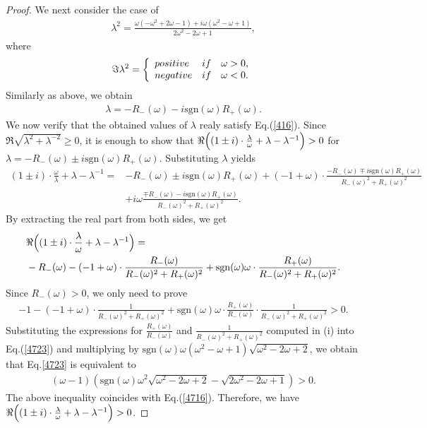 \documentclass[10pt,a4paper]{amsart}
\begin{document}
\begin{proof}
We next consider the case of 
\begin{align*}
\lambda ^2= \frac{\omega (-\omega ^2 +2\omega -1) + i\omega (\omega ^2 -\omega +1)}{2\omega ^2 -2\omega +1}, 
 \end{align*}
where 
\begin{eqnarray*}
\Im \lambda^2 = \left\{
\begin{array}{ll}
{\rm positive} &  {\rm if} \quad  \omega >0,\\
{\rm negative} & {\rm if} \quad \omega <0.
\end{array}
\right.
\end{eqnarray*}
Similarly as above, we obtain
\begin{align*}
    \lambda = -R_{-}(\omega)-i\mathrm{sgn}(\omega)R_{+}(\omega).
\end{align*}
We now verify that the obtained values of $\lambda$ realy satisfy Eq.(\ref{416}). Since $\Re \sqrt{\lambda^2 +\lambda^{-2}} \ge 0$, it is enough to show that $\Re \Bigl( (1\pm i) \cdot \frac{\lambda}{\omega}+\lambda -\lambda^{-1} \Bigr) > 0$ for $\lambda = -R_-(\omega) \pm i\mathrm{sgn}(\omega) R_+(\omega)$.
Substituting $\lambda$ yields
\begin{align*}
    (1 \pm i) \cdot \frac{\omega}{\lambda} +\lambda -\lambda^{-1} =& -R_{-}(\omega)\pm i\mathrm{sgn}(\omega)R_{+}(\omega)+(-1+\omega)\cdot \frac{-R_{-}(\omega)\mp i\mathrm{sgn}(\omega)R_{+}(\omega)}{R_-(\omega)^2+R_+(\omega)^2}\\
    &+i\omega\frac{\mp R_{-}(\omega)-i\mathrm{sgn}(\omega)R_{+}(\omega)}{R_-(\omega)^2+R_+(\omega)^2}.
\end{align*}
By extracting the real part from both sides, we get
\begin{align*}
    &\Re \Bigl( (1\pm i) \cdot \frac{\lambda}{\omega} +\lambda -\lambda^{-1} \Bigr) =\\
    &-R_-(\omega)-(-1+\omega)\cdot \frac{R_-(\omega)}{R_-(\omega)^2+R_+(\omega)^2}+\mathrm{sgn}(\omega)\omega\cdot  \frac{R_+(\omega)}{R_-(\omega)^2+R_+(\omega)^2}.
\end{align*}
Since $R_-(\omega)>0$, we only need to prove
\begin{align}
    -1-(-1+\omega)\cdot \frac{1}{R_-(\omega)^2+R_+(\omega)^2}+\mathrm{sgn}(\omega)\omega \cdot \frac{R_+(\omega)}{R_-(\omega)}\cdot  \frac{1}{R_-(\omega)^2+R_+(\omega)^2} > 0. \label{4723}
\end{align}
Substituting the expressions for $\frac{R_+(\omega)}{R_-(\omega)}$ and $\frac{1}{R_-(\omega)^2 + R_+(\omega)^2}$ computed in (i) into Eq.(\ref{4723}) and multiplying by 
$\mathrm{sgn}(\omega)\omega(\omega^2 - \omega + 1)\sqrt{\omega^2-2\omega+2}$,
we obtain that Eq.\eqref{4723} is equivalent to 
\begin{align*}
(\omega-1)(\mathrm{sgn}(\omega)\omega^2 \sqrt{\omega^2-2\omega +2} -\sqrt{2\omega^2-2\omega+1})>0.
\end{align*}
The above inequality coincides with Eq.(\ref{4716}). Therefore, we have $\Re \Bigl( (1 \pm i) \cdot \frac{\lambda}{\omega} +\lambda -\lambda^{-1} \Bigr) > 0$.
\end{proof}
\end{document}
